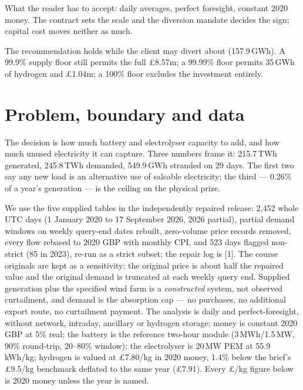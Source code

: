 \documentclass[11pt,a4paper]{article}
\begin{document}
What the reader has to accept: daily averages, perfect foresight, constant 2020 money. The contract
sets the scale and the diversion mandate decides the sign; capital cost moves neither as much.

\begin{caveatbox}
The recommendation holds while the client may divert about 
(157.9\,GWh). A 99.9\% supply floor still permits the full £8.57m; a 99.99\% floor permits
35\,GWh of hydrogen and £1.04m; a 100\% floor excludes the investment entirely.
\end{caveatbox}

\section{Problem, boundary and data}

The decision is how much battery and electrolyser capacity to add, and how much unused
electricity it can capture. Three numbers frame it: 215.7\,TWh generated, 245.8\,TWh demanded,
549.9\,GWh stranded on 29 days. The first two say any new load is an alternative use of
saleable electricity; the third --- 0.26\% of a year's generation --- is the ceiling on the
physical prize.

We use the five supplied tables in the independently repaired release: 2,452 whole UTC days
(1 January 2020 to 17 September 2026, 2026 partial), partial demand windows on weekly query-end
dates rebuilt, zero-volume price records removed, every flow rebased to 2020 GBP with monthly CPI,
and 523 days flagged non-strict (85 in 2023), re-run as a strict subset; the repair log is [1].
The course originals are kept as a sensitivity: the original price is about half the repaired value
and the original demand is truncated at each weekly query end. Supplied generation plus the
specified wind farm is a \emph{constructed} system, not observed curtailment, and demand is the
absorption cap --- no purchases, no additional export route, no curtailment payment. The analysis
is daily and perfect-foresight, without network, intraday, ancillary or hydrogen storage; money is
constant 2020 GBP at 5\% real; the battery is the reference two-hour module (3\,MWh/1.5\,MW, 90\%
round-trip, 20--80\% window); the electrolyser is 20\,MW PEM at 55.9\,kWh/kg; hydrogen is valued at
£7.80/kg in 2020 money, 1.4\% below the brief's £9.5/kg benchmark deflated to the same year
(£7.91). Every £/kg figure below is 2020 money unless the year is named.
\end{document}
